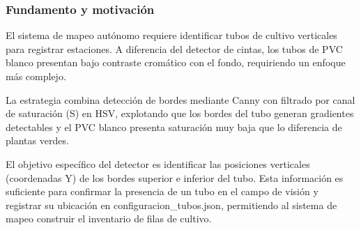 \subsubsection{Fundamento y motivación}

El sistema de mapeo autónomo requiere identificar tubos de cultivo verticales para registrar estaciones. A diferencia del detector de cintas, los tubos de PVC blanco presentan bajo contraste cromático con el fondo, requiriendo un enfoque más complejo.

La estrategia combina detección de bordes mediante Canny con filtrado por canal de saturación (S) en HSV, explotando que los bordes del tubo generan gradientes detectables y el PVC blanco presenta saturación muy baja que lo diferencia de plantas verdes.

El objetivo específico del detector es identificar las posiciones verticales (coordenadas Y) de los bordes superior e inferior del tubo. Esta información es suficiente para confirmar la presencia de un tubo en el campo de visión y registrar su ubicación en configuracion\_tubos.json, permitiendo al sistema de mapeo construir el inventario de filas de cultivo.

